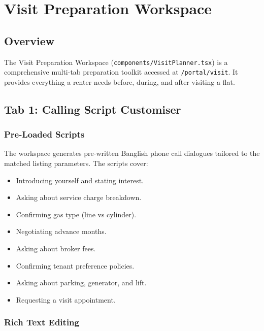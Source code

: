 \documentclass[12pt, a4paper, oneside]{report}
\newcommand{\filepath}[1]{\texttt{\small\color{codeblue}#1}}
\begin{document}
\chapter{Visit Preparation Workspace}

\section{Overview}

The Visit Preparation Workspace (\filepath{components/VisitPlanner.tsx}) is a comprehensive multi-tab preparation toolkit accessed at \texttt{/portal/visit}. It provides everything a renter needs before, during, and after visiting a flat.

\section{Tab 1: Calling Script Customiser}

\subsection{Pre-Loaded Scripts}

The workspace generates pre-written Banglish phone call dialogues tailored to the matched listing parameters. The scripts cover:

\begin{itemize}[leftmargin=2em]
  \item Introducing yourself and stating interest.
  \item Asking about service charge breakdown.
  \item Confirming gas type (line vs cylinder).
  \item Negotiating advance months.
  \item Asking about broker fees.
  \item Confirming tenant preference policies.
  \item Asking about parking, generator, and lift.
  \item Requesting a visit appointment.
\end{itemize}

\subsection{Rich Text Editing}
\end{document}
